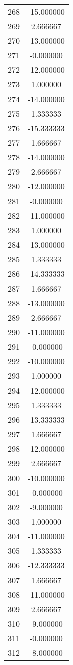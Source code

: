\documentclass[12pt]{article}
\begin{document}
\begin{longtable}{@{}cc@{}}
268 & -15.000000 \\
269 & 2.666667 \\
270 & -13.000000 \\
271 & -0.000000 \\
272 & -12.000000 \\
273 & 1.000000 \\
274 & -14.000000 \\
275 & 1.333333 \\
276 & -15.333333 \\
277 & 1.666667 \\
278 & -14.000000 \\
279 & 2.666667 \\
280 & -12.000000 \\
281 & -0.000000 \\
282 & -11.000000 \\
283 & 1.000000 \\
284 & -13.000000 \\
285 & 1.333333 \\
286 & -14.333333 \\
287 & 1.666667 \\
288 & -13.000000 \\
289 & 2.666667 \\
290 & -11.000000 \\
291 & -0.000000 \\
292 & -10.000000 \\
293 & 1.000000 \\
294 & -12.000000 \\
295 & 1.333333 \\
296 & -13.333333 \\
297 & 1.666667 \\
298 & -12.000000 \\
299 & 2.666667 \\
300 & -10.000000 \\
301 & -0.000000 \\
302 & -9.000000 \\
303 & 1.000000 \\
304 & -11.000000 \\
305 & 1.333333 \\
306 & -12.333333 \\
307 & 1.666667 \\
308 & -11.000000 \\
309 & 2.666667 \\
310 & -9.000000 \\
311 & -0.000000 \\
312 & -8.000000 \\

\end{longtable}
\end{document}
